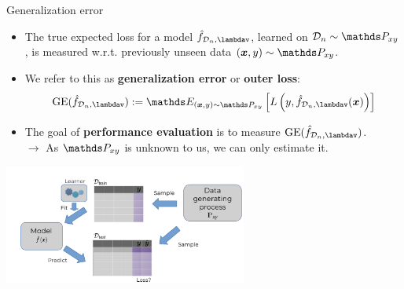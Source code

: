 \documentclass[11pt,compress,t,notes=noshow, xcolor=table]{beamer}
\begin{document}
\begin{vbframe}{Generalization error}

\begin{itemize}
  \item The true expected loss for a model $\fh_{\D_n, \lambdav}$, learned on 
  $\D_n \sim \Pxy$, is measured w.r.t. previously 
  unseen data $(\xv, y) \sim \Pxy$.
  \item We refer to this as \textbf{generalization error} or \textbf{outer 
  loss}:
  $$\mathrm{GE}(\fh_{\D_n, \lambdav}) := \E_{(\xv, y) \sim \Pxy}\left[ 
  L\left(y, \fh_{\D_n, \lambdav}(\xv)\right) \right]$$
  \item The goal of \textbf{performance evaluation} is to measure 
  $\mathrm{GE}(\fh_{\D_n, \lambdav})$. \\
  $\rightarrow$ As $\Pxy$ is unknown to us, we can only estimate it.
\end{itemize}

\begin{center}
\includegraphics[width=0.6\textwidth]{figure_man/evaluation-intro-ge.pdf}

\end{center}

\end{vbframe}

\end{document}
